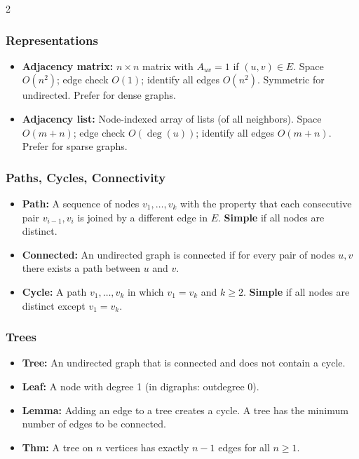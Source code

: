\documentclass[9pt]{article}
\begin{document}
\begin{multicols}{2}
\subsubsection*{Representations}

\begin{itemize}
  \item \textbf{Adjacency matrix:} $n\times n$ matrix with $A_{uv}=1$ if $(u,v)\in E$. Space $O(n^2)$; edge check $O(1)$; identify all edges $O(n^2)$. Symmetric for undirected. Prefer for dense graphs.
  \item \textbf{Adjacency list:} Node-indexed array of lists (of all neighbors). Space $O(m+n)$; edge check $O(\deg(u))$; identify all edges $O(m+n)$. Prefer for sparse graphs.
\end{itemize}

\subsubsection*{Paths, Cycles, Connectivity}

\begin{itemize}
  \item \textbf{Path:} A sequence of nodes $v_1,\dots,v_k$ with the property that each consecutive pair $v_{i-1},v_i$ is joined by a different edge in $E$. \textbf{Simple} if all nodes are distinct.
  \item \textbf{Connected:} An undirected graph is connected if for every pair of nodes $u,v$ there exists a path between $u$ and $v$.
  \item \textbf{Cycle:} A path $v_1,\dots,v_k$ in which $v_1=v_k$ and $k\ge2$. \textbf{Simple} if all nodes are distinct except $v_1=v_k$.
\end{itemize}

\subsubsection*{Trees}

\begin{itemize}
  \item \textbf{Tree:} An undirected graph that is connected and does not contain a cycle.
  \item \textbf{Leaf:} A node with degree 1 (in digraphs: outdegree 0).
  \item \textbf{Lemma:} Adding an edge to a tree creates a cycle. A tree has the minimum number of edges to be connected.
  \item \textbf{Thm:} A tree on $n$ vertices has exactly $n-1$ edges for all $n\ge1$.
\end{itemize}


\end{multicols}
\end{document}
